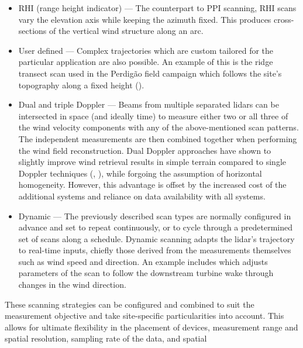 \begin{itemize}
\item RHI (range height indicator) --- The counterpart to PPI scanning, RHI scans vary the elevation axis while keeping the azimuth fixed. This produces cross-sections of the vertical wind structure along an arc.

\item User defined --- Complex trajectories which are custom tailored for the particular application are also possible. An example of this is the ridge transect scan used in the Perdig\~ao field campaign which follows the site's topography along a fixed height (\cite{robert_menke_perdigao_2017}).

\item Dual and triple Doppler --- Beams from multiple separated lidars can be intersected in space (and ideally time) to measure either two or all three of the wind velocity components with any of the above-mentioned scan patterns. The independent measurements are then combined together when performing the wind field reconstruction. Dual Doppler approaches have shown to slightly improve wind retrieval results in simple terrain compared to single Doppler techniques (\cite{simon_comparison_2016}, \cite{floors_report_2016}), while forgoing the assumption of horizontal homogeneity. However, this advantage is offset by the increased cost of the additional systems and reliance on data availability with all systems.

\item Dynamic --- The previously described scan types are normally configured in advance and set to repeat continuously, or to cycle through a predetermined set of scans along a schedule. Dynamic scanning adapts the lidar's trajectory to real-time inputs, chiefly those derived from the measurements themselves such as wind speed and direction. An example includes \cite{wildmann_wind_2018} which adjusts parameters of the scan to follow the downstream turbine wake through changes in the wind direction.

\end{itemize}

These scanning strategies can be configured and combined to suit the measurement objective and take site-specific particularities into account. This allows for ultimate flexibility in the placement of devices, measurement range and spatial resolution, sampling rate of the data, and spatial 

